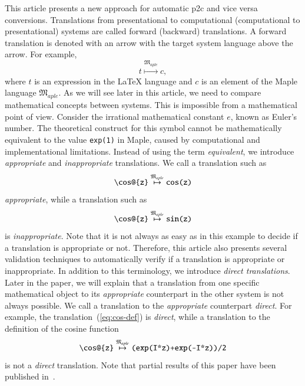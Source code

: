\documentclass[a4paper,11pt]{article}
\newcommand{\Maple}{Maple}
\newcommand{\langMaple}{\mathfrak{M}_{aple}}
\theoremstyle{defTheoStyle}
\theoremstyle{defExampStyle}
\begin{document}
This article presents a new approach for automatic \gls*{p2c} and vice versa conversions. Translations from presentational to computational (computational to presentational) systems are called forward (backward) translations. A forward translation is denoted with an arrow with the target system language above the arrow. For example,
\begin{equation*}
t \overset{\langMaple}{\mapsto} c,
\end{equation*}
where $t$ is an expression in the \LaTeX{} language and $c$ is an element of the \Maple{} language $\langMaple$. As we will see later in this article, we need to compare mathematical concepts between systems. This is impossible from a mathematical point of view. Consider the irrational mathematical constant $e$, known as Euler's number. The theoretical construct for this symbol cannot be mathematically equivalent to the value \verb|exp(1)| in \Maple, caused by computational and implementational limitations. Instead of using the term \textit{equivalent}, we introduce \textit{appropriate} and \textit{inappropriate} translations. We call a translation such as
\begin{equation}\label{eq:cos-def}
\verb|\cos@{z}| \overset{\langMaple}{\mapsto} \verb|cos(z)|
\end{equation}
\textit{appropriate}, while a translation such as
\begin{equation}
\verb|\cos@{z}| \overset{\langMaple}{\mapsto} \verb|sin(z)|
\end{equation}
is \textit{inappropriate}. Note that it is not always as easy as in this example to decide if a translation is appropriate or not. Therefore, this article also presents several validation techniques to automatically verify if a translation is appropriate or inappropriate. In addition to this terminology, we introduce \textit{direct translations}. Later in the paper, we will explain that a translation from one specific mathematical object to its \textit{appropriate} counterpart in the other system is not always possible. We call a translation to the \textit{appropriate} counterpart \textit{direct}. For example, the translation~(\ref{eq:cos-def}) is \textit{direct}, while a translation to the definition of the cosine function
\begin{equation*}
\verb|\cos@{z}| \overset{\langMaple}{\mapsto} \verb|(exp(I*z)+exp(-I*z))/2|
\end{equation*}
is not a \textit{direct} translation.
Note that partial results of this paper have been published in~\parencite{CICM:Paper}.
 
\end{document}
